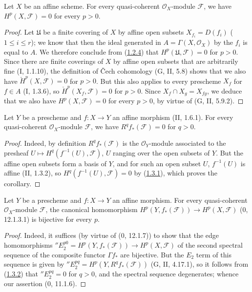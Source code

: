 \begin{theorem}[1.3.1]
\label{III.1.3.1}
Let $X$ be an affine scheme. For every quasi-coherent $\mathcal O_X$-module
$\mathcal F$, we have $H^p(X,\mathcal F)=0$ for every $p>0$.
\end{theorem}

\begin{proof}
Let $\mathfrak U$ be a finite covering of $X$ by affine open subsets
$X_{f_i}=D(f_i)$ ($1\leq i\leq r$); we know that then the ideal generated in
$A=\Gamma(X,\mathcal O_X)$ by the $f_i$ is equal to $A$. We therefore
conclude from (\hyperref[III.1.2.4]{1.2.4}) that
$H^p(\mathfrak U,\mathcal F)=0$ for $p>0$. Since there are finite
coverings of $X$ by affine open subsets that are arbitrarily fine
(I, 1.1.10), the definition of Čech cohomology (G, II, 5.8) shows that we
also have $\check H^p(X,\mathcal F)=0$ for $p>0$. But this also applies to
every prescheme $X_f$ for $f\in A$ (I, 1.3.6), so
$\check H^p(X_f,\mathcal F)=0$ for $p>0$. Since
$X_f\cap X_g=X_{fg}$, we deduce that we also have
$H^p(X,\mathcal F)=0$ for every $p>0$, by virtue of (G, II, 5.9.2).
\end{proof}

\begin{corollary}[1.3.2]
\label{III.1.3.2}
Let $Y$ be a prescheme and $f:X\to Y$ an affine morphism (II, 1.6.1). For
every quasi-coherent $\mathcal O_X$-module $\mathcal F$, we have
$R^qf_*(\mathcal F)=0$ for $q>0$.
\end{corollary}

\begin{proof}
Indeed, by definition $R^qf_*(\mathcal F)$ is the $\mathcal O_Y$-module
associated to the presheaf $U\mapsto H^q(f^{-1}(U),\mathcal F)$, $U$
ranging over the open subsets of $Y$. But the affine open subsets form a
basis of $Y$, and for such an open subset $U$, $f^{-1}(U)$ is affine
(II, 1.3.2), so $H^q(f^{-1}(U),\mathcal F)=0$ by
(\hyperref[III.1.3.1]{1.3.1}), which proves the corollary.
\end{proof}

\begin{corollary}[1.3.3]
\label{III.1.3.3}
Let $Y$ be a prescheme and $f:X\to Y$ an affine morphism. For every
quasi-coherent $\mathcal O_X$-module $\mathcal F$, the canonical homomorphism
$H^p(Y,f_*(\mathcal F))\to H^p(X,\mathcal F)$ (0, 12.1.3.1) is bijective
for every $p$.
\end{corollary}

\begin{proof}
Indeed, it suffices (by virtue of (0, 12.1.7)) to show that the
edge homomorphisms
$''E_2^{p0}=H^p(Y,f_*(\mathcal F))\to H^p(X,\mathcal F)$ of the second
spectral sequence of the composite functor $\Gamma f_*$ are bijective. But
the $E_2$ term of this sequence is given by
$''E_2^{pq}=H^p(Y,R^qf_*(\mathcal F))$ (G, II, 4.17.1), so it follows from
(\hyperref[III.1.3.2]{1.3.2}) that $''E_2^{pq}=0$ for $q>0$, and the
spectral sequence degenerates; whence our assertion (0, 11.1.6).
\end{proof}

